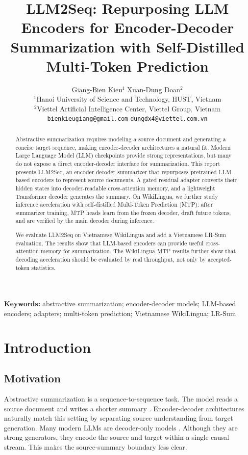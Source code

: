 \documentclass[11pt]{article}
\title{LLM2Seq: Repurposing LLM Encoders for Encoder-Decoder Summarization with Self-Distilled Multi-Token Prediction}
\author{
  Giang-Bien Kieu$^1$ \quad Xuan-Dung Doan$^2$ \\
  $^1$Hanoi University of Science and Technology, HUST, Vietnam \\
  $^2$Viettel Artificial Intelligence Center, Viettel Group, Vietnam \\
  \texttt{bienkieugiang@gmail.com} \quad \texttt{dungdx4@viettel.com.vn}
}
\begin{document}
\maketitle

\begin{abstract}
Abstractive summarization requires modeling a source document and generating a concise target sequence, making encoder-decoder architectures a natural fit.
Modern Large Language Model (LLM) checkpoints provide strong representations, but many do not expose a direct encoder-decoder interface for summarization.
This report presents LLM2Seq, an encoder-decoder summarizer that repurposes pretrained LLM-based encoders to represent source documents.
A gated residual adapter converts their hidden states into decoder-readable cross-attention memory, and a lightweight Transformer decoder generates the summary.
On WikiLingua, we further study inference acceleration with self-distilled Multi-Token Prediction (MTP): after summarizer training, MTP heads learn from the frozen decoder, draft future tokens, and are verified by the main decoder during inference.

We evaluate LLM2Seq on Vietnamese WikiLingua and add a Vietnamese LR-Sum evaluation.
The results show that LLM-based encoders can provide useful cross-attention memory for summarization.
The WikiLingua MTP results further show that decoding acceleration should be evaluated by real throughput, not only by accepted-token statistics.
\end{abstract}

\noindent\textbf{Keywords:} abstractive summarization; encoder-decoder models; LLM-based encoders; adapters; multi-token prediction; Vietnamese WikiLingua; LR-Sum

\section{Introduction}
\label{sec:introduction}

\subsection{Motivation}

Abstractive summarization is a sequence-to-sequence task.
The model reads a source document and writes a shorter summary \citep{sutskever2014sequence,bahdanau2015neural,vaswani2017attention}.
Encoder-decoder architectures naturally match this setting by separating source understanding from target generation.
Many modern LLMs are decoder-only models \citep{brown2020language,dubey2024llama3,yang2024qwen2}.
Although they are strong generators, they encode the source and target within a single causal stream.
This makes the source-summary boundary less clear.
\end{document}
